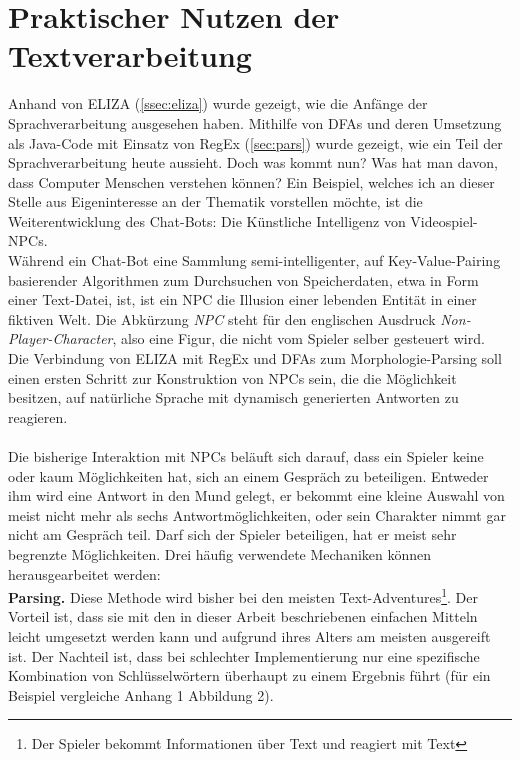 \documentclass[12pt,twoside]{article}
\theoremstyle{plain}
\theoremstyle{definition}
\theoremstyle{remark}
\begin{document}
\section{Praktischer Nutzen der Textverarbeitung}
\label{sec:ausb}
Anhand von ELIZA (\ref{ssec:eliza}) wurde gezeigt, wie die Anfänge der Sprachverarbeitung ausgesehen haben.
Mithilfe von DFAs und deren Umsetzung als Java-Code mit Einsatz von RegEx (\ref{sec:pars}) wurde gezeigt, wie ein Teil der Sprachverarbeitung heute aussieht.
Doch was kommt nun?
Was hat man davon, dass Computer Menschen verstehen können?
Ein Beispiel, welches ich an dieser Stelle aus Eigeninteresse an der Thematik vorstellen möchte, ist die Weiterentwicklung des Chat-Bots: Die Künstliche Intelligenz von Videospiel-NPCs.\\
Während ein Chat-Bot eine Sammlung semi-intelligenter, auf Key-Value-Pairing basierender Algorithmen zum Durchsuchen von Speicherdaten, etwa in Form einer Text-Datei, ist, ist ein NPC die Illusion einer lebenden Entität in einer fiktiven Welt.
Die Abkürzung \textit{NPC} steht für den englischen Ausdruck \textit{Non-Player-Character}, also eine Figur, die nicht vom Spieler selber gesteuert wird.\\
Die Verbindung von ELIZA mit RegEx und DFAs zum Morphologie-Parsing soll einen ersten Schritt zur Konstruktion von NPCs sein, die die Möglichkeit besitzen, auf natürliche Sprache mit dynamisch generierten Antworten zu reagieren.\\
\\
Die bisherige Interaktion mit NPCs beläuft sich darauf, dass ein Spieler keine oder kaum Möglichkeiten hat, sich an einem Gespräch zu beteiligen.
Entweder ihm wird eine Antwort in den Mund gelegt, er bekommt eine kleine Auswahl von meist nicht mehr als sechs Antwortmöglichkeiten, oder sein Charakter nimmt gar nicht am Gespräch teil.
Darf sich der Spieler beteiligen, hat er meist sehr begrenzte Möglichkeiten.
Drei häufig verwendete Mechaniken können herausgearbeitet werden:\\
\textbf{Parsing.}
Diese Methode wird bisher bei den meisten Text-Adventures\footnote{Der Spieler bekommt Informationen über Text und reagiert mit Text}.
Der Vorteil ist, dass sie mit den in dieser Arbeit beschriebenen einfachen Mitteln leicht umgesetzt werden kann und aufgrund ihres Alters am meisten ausgereift ist.
Der Nachteil ist, dass bei schlechter Implementierung nur eine spezifische Kombination von Schlüsselwörtern überhaupt zu einem Ergebnis führt (für ein Beispiel vergleiche Anhang 1 Abbildung 2).\\
\end{document}
